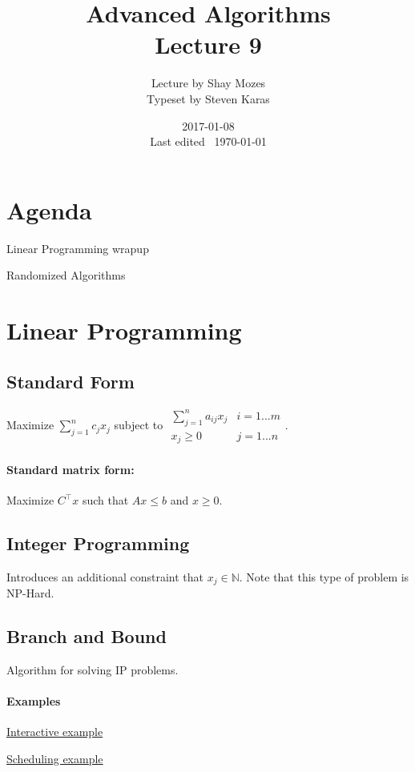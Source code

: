 \documentclass[a4paper]{article}
\title{Advanced Algorithms\\\large Lecture 9}
\date{2017-01-08 \\ Last edited \currenttime\ \today}
\author{Lecture by Shay Mozes\\Typeset by Steven Karas}
\newenvironment{itemize*}%
  {\begin{itemize}%
    \setlength{\itemsep}{0pt}%
    \setlength{\parsep}{0pt}%
    \setlength{\parskip}{0pt}}%
  {\end{itemize}}
\newenvironment{enumerate*}%
  {\begin{enumerate}%
    \setlength{\itemsep}{0.5pt}%
    \setlength{\parsep}{0pt}%
    \setlength{\parskip}{0pt}}%
  {\end{enumerate}}
\begin{document}
\maketitle

\section{Agenda}
\begin{enumerate*}
  \item Linear Programming wrapup
  \item Randomized Algorithms
\end{enumerate*}

\section{Linear Programming}

\subsection{Standard Form}
Maximize $\sum\limits_{j=1}^n c_j x_j$ subject to $\begin{matrix}\sum_{j=1}^n a_{ij} x_j & i=1 ... m \\ x_j\ge 0 & j = 1 ... n\end{matrix}$.

\paragraph{Standard matrix form:}
Maximize $C^\intercal x$ such that $Ax \le b$ and $x \ge 0$.

\subsection{Integer Programming}
Introduces an additional constraint that $x_j \in \mathbb{N}$. Note that this type of problem is NP-Hard.

\subsection{Branch and Bound}
Algorithm for solving IP problems.

\paragraph{Examples}

\begin{itemize*}
  \item \href{http://optlab-server.sce.carleton.ca/POAnimations2007/MILP.html}{Interactive example}
  \item \href{http://optlab-server.sce.carleton.ca/POAnimations2007/BranchAndBound.html}{Scheduling example}
\end{itemize*}
\end{document}
